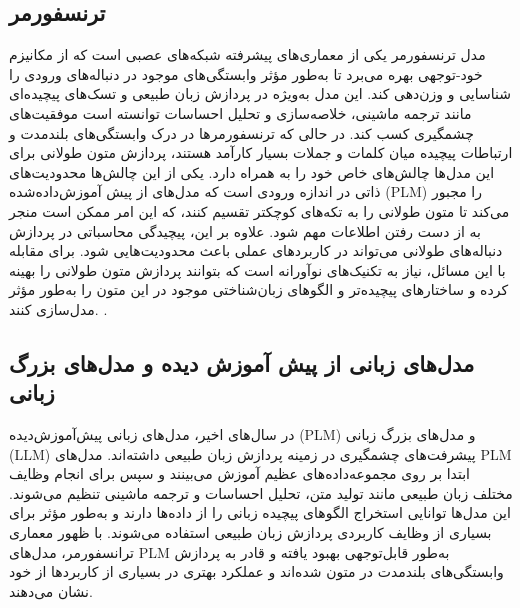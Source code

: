 \subsection{ترنسفورمر}
مدل ترنسفورمر یکی از معماری‌های پیشرفته شبکه‌های عصبی است که از مکانیزم خود-توجهی
   بهره می‌برد تا به‌طور مؤثر وابستگی‌های موجود در دنباله‌های ورودی را شناسایی و وزن‌دهی کند. این مدل به‌ویژه در پردازش زبان طبیعی و تسک‌های پیچیده‌ای مانند ترجمه ماشینی، خلاصه‌سازی و تحلیل احساسات توانسته است موفقیت‌های چشمگیری کسب کند. در حالی که ترنسفورمرها در درک وابستگی‌های بلندمدت و ارتباطات پیچیده میان کلمات و جملات بسیار کارآمد هستند، پردازش متون طولانی برای این مدل‌ها چالش‌های خاص خود را به همراه دارد. یکی از این چالش‌ها محدودیت‌های ذاتی در اندازه ورودی است که مدل‌های از پیش آموزش‌داده‌شده (PLM) را مجبور می‌کند تا متون طولانی را به تکه‌های کوچکتر تقسیم کنند، که این امر ممکن است منجر به از دست رفتن اطلاعات مهم شود. علاوه بر این، پیچیدگی محاسباتی در پردازش دنباله‌های طولانی می‌تواند در کاربردهای عملی باعث محدودیت‌هایی شود. برای مقابله با این مسائل، نیاز به تکنیک‌های نوآورانه است که بتوانند پردازش متون طولانی را بهینه کرده و ساختارهای پیچیده‌تر و الگوهای زبان‌شناختی موجود در این متون را به‌طور مؤثر مدل‌سازی کنند.
 \cite{dong2023surveylongtextmodeling} .





\subsection{ مدل‌های زبانی از پیش آموزش دیده و مدل‌های بزرگ زبانی}
در سال‌های اخیر، مدل‌های زبانی پیش‌آموزش‌دیده (PLM) و مدل‌های بزرگ زبانی (LLM) پیشرفت‌های چشمگیری در زمینه پردازش زبان طبیعی داشته‌اند. مدل‌های PLM ابتدا بر روی مجموعه‌داده‌های عظیم آموزش می‌بینند و سپس برای انجام وظایف مختلف زبان طبیعی مانند تولید متن، تحلیل احساسات و ترجمه ماشینی تنظیم می‌شوند. این مدل‌ها توانایی استخراج الگوهای پیچیده زبانی را از داده‌ها دارند و به‌طور مؤثر برای بسیاری از وظایف کاربردی پردازش زبان طبیعی استفاده می‌شوند. با ظهور معماری ترانسفورمر، مدل‌های PLM به‌طور قابل‌توجهی بهبود یافته و قادر به پردازش وابستگی‌های بلندمدت در متون شده‌اند و عملکرد بهتری در بسیاری از کاربردها از خود نشان می‌دهند.

